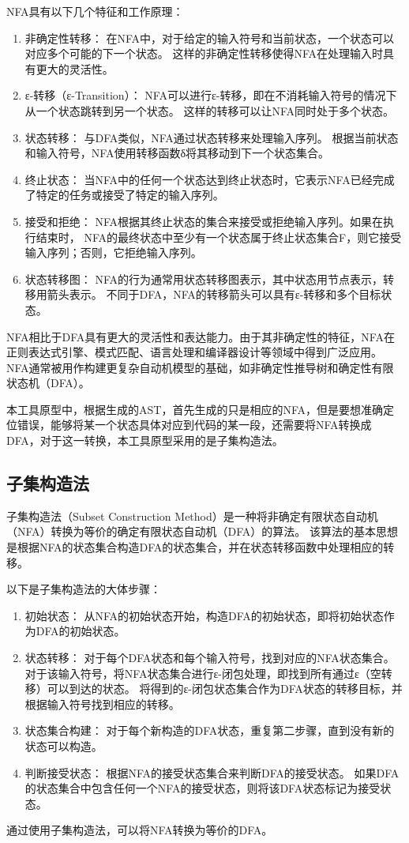 NFA具有以下几个特征和工作原理：
\begin{enumerate}
	\item 非确定性转移： 在NFA中，对于给定的输入符号和当前状态，一个状态可以对应多个可能的下一个状态。
 这样的非确定性转移使得NFA在处理输入时具有更大的灵活性。
	\item ε-转移（ε-Transition）： NFA可以进行ε-转移，即在不消耗输入符号的情况下从一个状态跳转到另一个状态。
 这样的转移可以让NFA同时处于多个状态。
	\item 状态转移： 与DFA类似，NFA通过状态转移来处理输入序列。
 根据当前状态和输入符号，NFA使用转移函数δ将其移动到下一个状态集合。
	\item 终止状态： 当NFA中的任何一个状态达到终止状态时，它表示NFA已经完成了特定的任务或接受了特定的输入序列。
	\item 接受和拒绝： NFA根据其终止状态的集合来接受或拒绝输入序列。如果在执行结束时，
 NFA的最终状态中至少有一个状态属于终止状态集合F，则它接受输入序列；否则，它拒绝输入序列。
    \item 状态转移图： NFA的行为通常用状态转移图表示，其中状态用节点表示，转移用箭头表示。
    不同于DFA，NFA的转移箭头可以具有ε-转移和多个目标状态。
\end{enumerate}
NFA相比于DFA具有更大的灵活性和表达能力。由于其非确定性的特征，NFA在正则表达式引擎、模式匹配、语言处理和编译器设计等领域中得到广泛应用。
NFA通常被用作构建更复杂自动机模型的基础，如非确定性推导树和确定性有限状态机（DFA）。

本工具原型中，根据生成的AST，首先生成的只是相应的NFA，但是要想准确定位错误，能够将某一个状态具体对应到代码的某一段，还需要将NFA转换成
DFA，对于这一转换，本工具原型采用的是子集构造法。
\subsection{子集构造法}
子集构造法（Subset Construction Method）是一种将非确定有限状态自动机（NFA）转换为等价的确定有限状态自动机（DFA）的算法。
该算法的基本思想是根据NFA的状态集合构造DFA的状态集合，并在状态转移函数中处理相应的转移。

以下是子集构造法的大体步骤：
\begin{enumerate}
	\item  初始状态：
 从NFA的初始状态开始，构造DFA的初始状态，即将初始状态作为DFA的初始状态。
    \item  状态转移：
对于每个DFA状态和每个输入符号，找到对应的NFA状态集合。
对于该输入符号，将NFA状态集合进行ε-闭包处理，即找到所有通过ε（空转移）可以到达的状态。
将得到的ε-闭包状态集合作为DFA状态的转移目标，并根据输入符号找到相应的转移。
    \item  状态集合构建：
对于每个新构造的DFA状态，重复第二步骤，直到没有新的状态可以构造。
    \item  判断接受状态：
根据NFA的接受状态集合来判断DFA的接受状态。
如果DFA的状态集合中包含任何一个NFA的接受状态，则将该DFA状态标记为接受状态。
\end{enumerate}
通过使用子集构造法，可以将NFA转换为等价的DFA。


